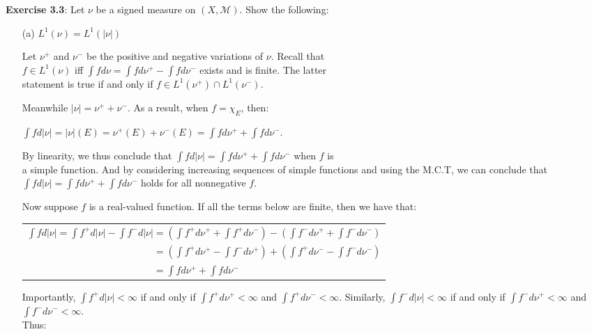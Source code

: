 \documentclass{book}
\newcommand{\exTwoP}{%
   \color{RedViolet}%
   \fontsize{13}{15}\selectfont%
}
\newcommand{\exPP}{%
   \color{RedViolet}%
   \fontsize{12}{14}\selectfont%
}
\newenvironment{myIndent}{%
   \begin{adjustwidth}{2.5em}{0em}%
}{%
   \end{adjustwidth}%
}
\newcommand{\blab}[1]{\textbf{#1}}
\newcommand{\retTwo}{\hfill\bigbreak}
\begin{document}
\blab{Exercise 3.3}: Let $\nu$ be a signed measure on $(X, \mathcal{M})$. Show the following:
\begin{enumerate}
	\item[(a)] $L^1(\nu) = L^1(|\nu|)$
	
	\begin{myIndent}\exTwoP
		Let $\nu^+$ and $\nu^-$ be the positive and negative variations of $\nu$. Recall that\\ $f \in L^1(\nu)$ iff $\int f d\nu = \int f d\nu^+ - \int fd\nu^-$ exists and is finite. The latter\\ statement is true if and only if $f \in L^1(\nu^+) \cap L^1(\nu^-)$.\retTwo

		Meanwhile $|\nu| = \nu^+ + \nu^-$. As a result, when $f = \chi_E$, then:
		
		{\centering$\int f d|\nu| = |\nu|(E) = \nu^+(E) + \nu^-(E) = \int f d\nu^+ + \int fd\nu^-$.\retTwo\par}

		By linearity, we thus conclude that $\int f d|\nu| = \int f d\nu^+ + \int f d\nu^-$ when $f$ is\\ a simple function. And by considering increasing sequences of simple functions and using the M.C.T, we can conclude that $\int f d|\nu| = \int f d\nu^+ + \int f d\nu^-$ holds for all nonnegative $f$.\retTwo

		Now suppose $f$ is a real-valued function. If all the terms below are finite, then we have that:

		{\centering\exPP\begin{tabular}{l}
			$\int fd|\nu| = \int f^+d|\nu| - \int f^-d|\nu| = (\int f^+d\nu^+ + \int f^+d\nu^-) - (\int f^-d\nu^+ + \int f^-d\nu^-) $\\ [6pt]

			$\phantom{\int fd|\nu| = \int f^+d|\nu| - \int f^-d|\nu|} =  (\int f^+ d\nu^+ - \int f^-d\nu^+) + (\int f^+ d\nu^- - \int f^-d\nu^-)$\\ [6pt]

			$\phantom{\int fd|\nu| = \int f^+d|\nu| - \int f^-d|\nu|} = \int f d\nu^+ + \int fd\nu^-$
		\end{tabular}\retTwo\par}

		Importantly, $\int f^+ d|\nu| < \infty$ if and only if $\int f^+ d\nu^+ < \infty$ and $\int f^+ d\nu^- < \infty$. Similarly, $\int f^- d|\nu| < \infty$ if and only if $\int f^- d\nu^+ < \infty$ and $\int f^- d\nu^- < \infty$.\\ Thus:


\end{myIndent}
\end{enumerate}
\end{document}

